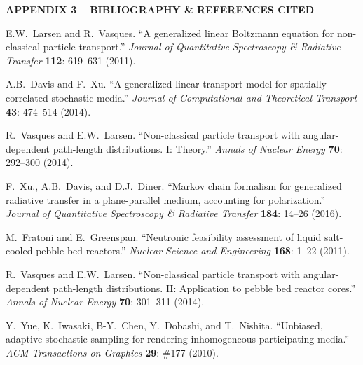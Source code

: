 \documentclass[12pt]{article}
\begin{document}
\pagebreak


\begin{center}
{\bf APPENDIX 3 -- BIBLIOGRAPHY \& REFERENCES CITED}
\end{center}

\begin{thebibliography}{10}

E.W.~Larsen and R.~Vasques.
``A generalized linear Boltzmann equation for non-classical particle transport.''
\textit{Journal of Quantitative Spectroscopy \& Radiative Transfer} \textbf{112}: 619--631 (2011).\vspace{-5pt}

A.B.~Davis and F.~Xu.
``A generalized linear transport model for spatially correlated stochastic media.''
\textit{Journal of Computational and Theoretical Transport} \textbf{43}: 474--514 (2014).\vspace{-5pt}

R.~Vasques and E.W.~Larsen.
``Non-classical particle transport with angular-dependent path-length distributions. I: Theory.''
\textit{Annals of Nuclear Energy} \textbf{70}: 292--300 (2014).\vspace{-5pt}

F.~Xu., A.B.~Davis, and D.J.~Diner.
``Markov chain formalism for generalized radiative transfer in a plane-parallel medium, accounting for polarization.''
\textit{Journal of Quantitative Spectroscopy \& Radiative Transfer} \textbf{184}: 14--26 (2016).\vspace{-5pt}

M.~Fratoni and E.~Greenspan.
``Neutronic feasibility assessment of liquid salt-cooled pebble bed reactors.''
\textit{Nuclear Science and Engineering} \textbf{168}: 1--22 (2011). \vspace{-5pt}

R.~Vasques and E.W.~Larsen.
``Non-classical particle transport with angular-dependent path-length distributions. II: Application to pebble bed reactor cores.''
\textit{Annals of Nuclear Energy} \textbf{70}: 301--311 (2014). \vspace{-5pt}

Y.~Yue, K.~Iwasaki, B-Y.~Chen, Y.~Dobashi, and T.~Nishita.
``Unbiased, adaptive stochastic sampling for rendering inhomogeneous participating media.''
\textit{ACM Transactions on Graphics} \textbf{29}: \#177 (2010).\vspace{-5pt}


\end{thebibliography}
\end{document}

